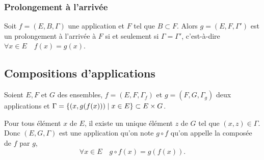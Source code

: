 \subsubsection{Prolongement à l'arrivée}
\label{chap3-subsubsec:prolongementarr}
Soit \(f=(E,B,\Gamma)\) une application et \(F\) tel que \(B \subset F\). Alors \(g=(E,F,\Gamma')\) est un prolongement à l'arrivée à \(F\) si et seulement si \(\Gamma = \Gamma'\), c'est-à-dire \(\forall x \in E \quad f(x)=g(x)\).
%
\subsection{Compositions d'applications}
\label{chap3-subsec:compapp}
\begin{defdef}
  Soient \(E,F\) et \(G\) des ensembles, \(f=(E,F,\Gamma_f)\) et \(g=(F,G, \Gamma_g)\) deux applications et \(\Gamma = \left\{(x,g(f(x)))\mathrel{}\middle|\mathrel{}x \in E\right\} \subset E \times G\).
\end{defdef}
Pour tous élément \(x\) de \(E\), il existe un unique élément \(z\) de \(G\) tel que \((x,z) \in \Gamma\). Donc \((E,G,\Gamma)\) est une application qu'on note \(g \circ f\) qu'on appelle la composée de \(f\) par \(g\),
\begin{equation}
  \forall x \in E \quad g \circ f(x)=g(f(x)).
\end{equation}


